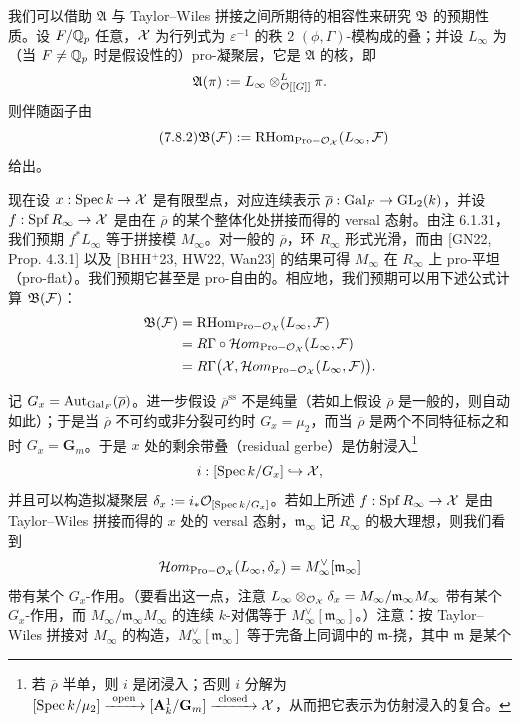 我们可以借助 $\mathfrak A$ 与 Taylor--Wiles 拼接之间所期待的相容性来研究 $\mathfrak B$ 的预期性质。设 $F/\mathbb{Q}_p$ 任意，$\mathcal{X}$ 为行列式为 $\varepsilon^{-1}$ 的秩 $2$ $(\phi,\Gamma)$-模构成的叠；并设 $L_\infty$ 为（当 $F\neq\mathbb{Q}_p$ 时是假设性的）pro-凝聚层，它是 $\mathfrak A$ 的核，即
\[
\mathfrak A(\pi):=L_\infty\otimes^L_{\mathcal{O}[[G]]}\pi.
\]
则伴随函子由
\begin{equation}\tag{7.8.2}
\mathfrak B(\mathcal{F}):=\mathrm{RHom}_{\mathrm{Pro-}\mathcal{O}_{\mathcal{X}}}(L_\infty,\mathcal{F})
\end{equation}
给出。

现在设 $x:\operatorname{Spec} k\rightarrow\mathcal{X}$ 是有限型点，对应连续表示 $\overline{\rho}:\operatorname{Gal}_F\rightarrow\mathrm{GL}_2(k)$，并设 $f:\operatorname{Spf} R_\infty\rightarrow\mathcal{X}$ 是由在 $\overline{\rho}$ 的某个整体化处拼接而得的 versal 态射。由注 6.1.31，我们预期 $f^*L_\infty$ 等于拼接模 $M_\infty$。对一般的 $\overline{\rho}$，环 $R_\infty$ 形式光滑，而由 [GN22, Prop. 4.3.1] 以及 [BHH${}^{+}$23, HW22, Wan23] 的结果可得 $M_\infty$ 在 $R_\infty$ 上 pro-平坦（pro-flat）。我们预期它甚至是 pro-自由的。相应地，我们预期可以用下述公式计算 $\mathfrak B(\mathcal{F})$：
\[
\begin{aligned}
\mathfrak B(\mathcal{F})&=\mathrm{RHom}_{\mathrm{Pro-}\mathcal{O}_{\mathcal{X}}}(L_\infty,\mathcal{F})\\
&=R\Gamma\circ\mathcal Hom_{\mathrm{Pro-}\mathcal{O}_{\mathcal{X}}}(L_\infty,\mathcal{F})\\
&=R\Gamma\bigl(\mathcal{X},\mathcal Hom_{\mathrm{Pro-}\mathcal{O}_{\mathcal{X}}}(L_\infty,\mathcal{F})\bigr).
\end{aligned}
\]

记 $G_x=\operatorname{Aut}_{\operatorname{Gal}_F}(\overline{\rho})$。进一步假设 $\overline{\rho}^{\mathrm{ss}}$ 不是纯量（若如上假设 $\overline{\rho}$ 是一般的，则自动如此）；于是当 $\overline{\rho}$ 不可约或非分裂可约时 $G_x=\mu_2$，而当 $\overline{\rho}$ 是两个不同特征标之和时 $G_x=\mathbf G_m$。于是 $x$ 处的剩余带叠（residual gerbe）是仿射浸入\footnote{若 $\overline{\rho}$ 半单，则 $i$ 是闭浸入；否则 $i$ 分解为 $[\Spec k/\mu_2]\xrightarrow{\ \mathrm{open}\ }[\mathbf A^1_k/\mathbf G_m]\xrightarrow{\ \mathrm{closed}\ }\XX$，从而把它表示为仿射浸入的复合。}
\[
i:[\operatorname{Spec} k/G_x]\hookrightarrow\mathcal{X},
\]
并且可以构造拟凝聚层 $\delta_x:=i_*\mathcal{O}_{[\operatorname{Spec} k/G_x]}$。若如上所述 $f:\operatorname{Spf} R_\infty\rightarrow\mathcal{X}$ 是由 Taylor--Wiles 拼接而得的 $x$ 处的 versal 态射，$\mathfrak m_\infty$ 记 $R_\infty$ 的极大理想，则我们看到
\[
\mathcal Hom_{\mathrm{Pro-}\mathcal{O}_{\mathcal{X}}}(L_\infty,\delta_x)=M_\infty^\vee[\mathfrak m_\infty]
\]
带有某个 $G_x$-作用。（要看出这一点，注意 $L_\infty\otimes_{\mathcal{O}_{\mathcal{X}}}\delta_x=M_\infty/\mathfrak m_\infty M_\infty$ 带有某个 $G_x$-作用，而 $M_\infty/\mathfrak m_\infty M_\infty$ 的连续 $k$-对偶等于 $M_\infty^\vee[\mathfrak m_\infty]$。）注意：按 Taylor--Wiles 拼接对 $M_\infty$ 的构造，$M_\infty^\vee[\mathfrak m_\infty]$ 等于完备上同调中的 $\mathfrak m$-挠，其中 $\mathfrak m$ 是某个

